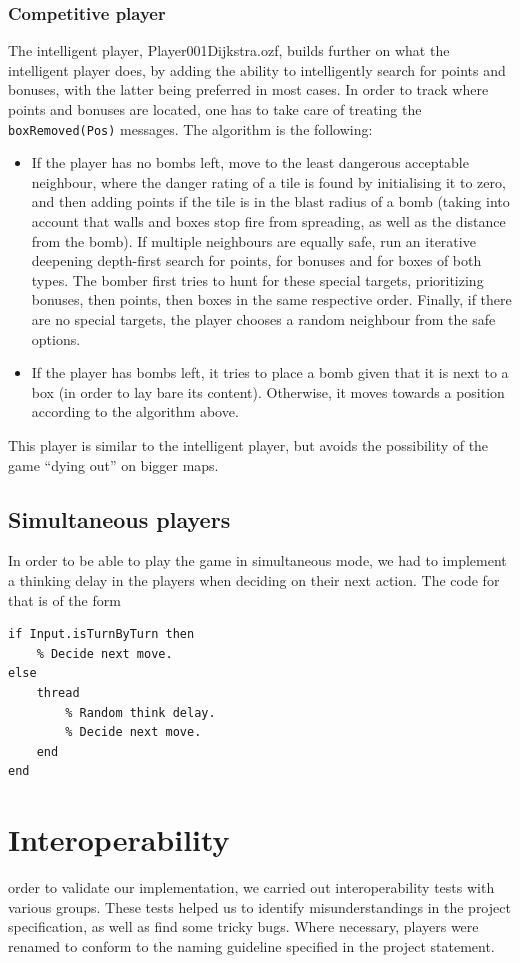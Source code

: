 \documentclass[12pt,journal]{IEEEtran}
\newcommand{\ntt}{\normalfont\ttfamily}
\newcommand{\fn}[1]{{\protect\ntt#1}}
\begin{document}
\subsubsection{Competitive player}
The intelligent player, \fn{Player001Dijkstra.ozf}, builds further on what the intelligent player does, by adding the ability to intelligently search for points and bonuses, with the latter being preferred in most cases.
In order to track where points and bonuses are located, one has to take care of treating the \lstinline|boxRemoved(Pos)| messages.
The algorithm is the following:
\begin{itemize}
	\item If the player has no bombs left, move to the least dangerous acceptable neighbour, where the danger rating of a tile is found by initialising it to zero, and then adding points if the tile is in the blast radius of a bomb (taking into account that walls and boxes stop fire from spreading, as well as the distance from the bomb).
	If multiple neighbours are equally safe, run an iterative deepening depth-first search for points, for bonuses and for boxes of both types.
	The bomber first tries to hunt for these special targets, prioritizing bonuses, then points, then boxes in the same respective order.
	Finally, if there are no special targets, the player chooses a random neighbour from the safe options.
	\item If the player has bombs left, it tries to place a bomb given that it is next to a box (in order to lay bare its content).
	Otherwise, it moves towards a position according to the algorithm above.
\end{itemize}

This player is similar to the intelligent player, but avoids the possibility of the game ``dying out'' on bigger maps.

\subsection{Simultaneous players}
In order to be able to play the game in simultaneous mode, we had to implement a thinking delay in the players when deciding on their next action.
The code for that is of the form
\begin{lstlisting}
if Input.isTurnByTurn then
	% Decide next move.
else
	thread
		% Random think delay.
		% Decide next move.
	end
end
\end{lstlisting}

\section{Interoperability}
\label{sec:interop}
 order to validate our implementation, we carried out interoperability tests with various groups.
These tests helped us to identify misunderstandings in the project specification, as well as find some tricky bugs.
Where necessary, players were renamed to conform to the naming guideline specified in the project statement.
\end{document}
